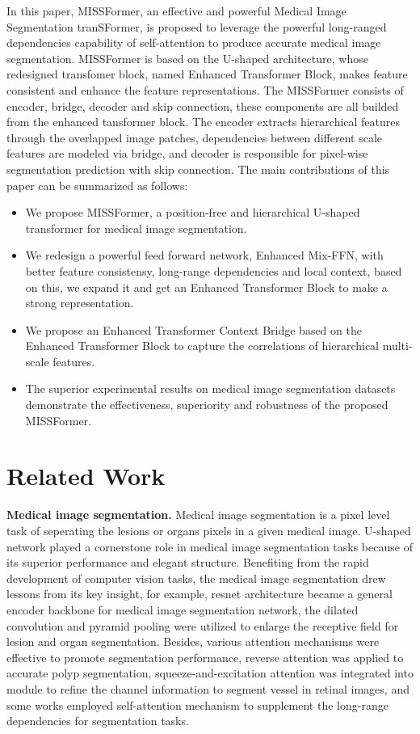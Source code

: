 \documentclass[letterpaper]{article} \usepackage{aaai22}  \usepackage{times}  \usepackage{helvet}  \usepackage{courier}  \usepackage[hyphens]{url}  \usepackage{graphicx} \urlstyle{rm} \def\UrlFont{\rm}  \usepackage{natbib}  \usepackage{caption} \DeclareCaptionStyle{ruled}{labelfont=normalfont,labelsep=colon,strut=off} \frenchspacing  \setlength{\pdfpagewidth}{8.5in}  \setlength{\pdfpageheight}{11in}  \usepackage{algorithm}
\begin{document}
In this paper, MISSFormer, an effective and powerful Medical Image Segmentation tranSFormer, is proposed to leverage the powerful long-ranged dependencies capability of self-attention to produce accurate medical image segmentation. MISSFormer is based on the U-shaped architecture, whose redesigned transfomer block, named Enhanced Transformer Block, makes feature consistent and enhance the feature representations. The MISSFormer consists of encoder, bridge, decoder and skip connection, these components are all builded from the enhanced tansformer block. The encoder extracts hierarchical features through the overlapped image patches, dependencies between different scale features are modeled via bridge, and decoder is responsible for pixel-wise segmentation prediction with skip connection. The main contributions of this paper can be summarized as follows:
\begin{itemize}
	\item We propose MISSFormer, a position-free and hierarchical U-shaped transformer for medical image segmentation.
	\item We redesign a powerful feed forward network, Enhanced Mix-FFN, with better feature consistensy, long-range dependencies and local context, based on this, we expand it and get an Enhanced Transformer Block to make a strong representation.
	\item We propose an Enhanced Transformer Context Bridge based on the Enhanced Transformer Block to capture the correlations of hierarchical multi-scale features.
	\item The superior experimental results on medical image segmentation datasets demonstrate the effectiveness, superiority and robustness of the proposed MISSFormer.
\end{itemize}

\section{Related Work}
\textbf{Medical image segmentation.} Medical image segmentation is a pixel level task of seperating the lesions or organs pixels in a given medical image. U-shaped network\cite{2015U} played a cornerstone role in medical image segmentation tasks because of its superior performance and elegant structure. Benefiting from the rapid development of computer vision tasks\cite{he2016deep,Chen2017}, the medical image segmentation drew lessons from its key insight, for example, resnet architecture became a general encoder backbone for medical image segmentation network, the dilated convolution and pyramid pooling were utilized to enlarge the receptive field for lesion and organ segmentation\cite{Gu2019,Feng2020}. Besides, various attention mechanisms were effective to promote segmentation performance, reverse attention\cite{chen2018reverse} was applied to accurate polyp segmentation\cite{fan2020pranet}, squeeze-and-excitation attention\cite{hu2018squeeze} was integrated into module to refine the channel information to segment vessel in retinal images\cite{zhang2019net}, and some works\cite{mou2019cs,Sinha2020} employed self-attention mechanism to supplement the long-range dependencies for segmentation tasks.
\end{document}
